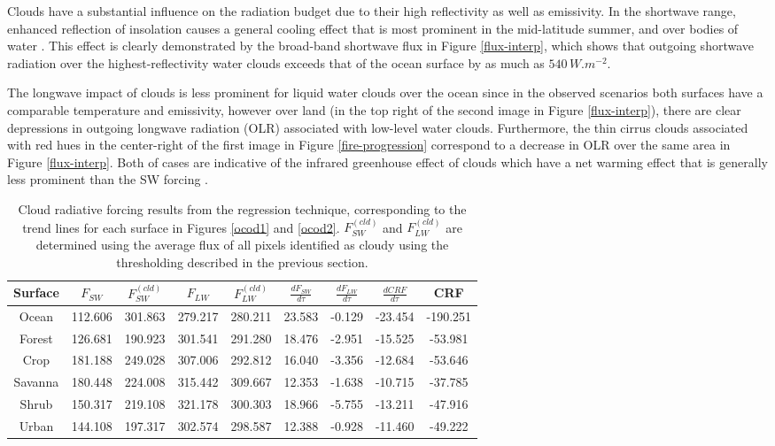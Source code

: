\documentclass[12pt]{article}
\newcommand\T{\rule{0pt}{2.6ex}}       %
\newcommand\B{\rule[-1.2ex]{0pt}{0pt}} %
\begin{document}
     Clouds have a substantial influence on the radiation budget due to their high reflectivity as well as emissivity. In the shortwave range, enhanced reflection of insolation causes a general cooling effect that is most prominent in the mid-latitude summer, and over bodies of water \cite{harrison_seasonal_1990}. This effect is clearly demonstrated by the broad-band shortwave flux in Figure \ref{flux-interp}, which shows that outgoing shortwave radiation over the highest-reflectivity water clouds exceeds that of the ocean surface by as much as $540\,\si{W.m^{-2}}$.

    The longwave impact of clouds is less prominent for liquid water clouds over the ocean since in the observed scenarios both surfaces have a comparable temperature and emissivity, however over land (in the top right of the second image in Figure \ref{flux-interp}), there are clear depressions in outgoing longwave radiation (OLR) associated with low-level water clouds. Furthermore, the thin cirrus clouds associated with red hues in the center-right of the first image in Figure \ref{fire-progression} correspond to a decrease in OLR over the same area in Figure \ref{flux-interp}. Both of cases are indicative of the infrared greenhouse effect of clouds which have a net warming effect that is generally less prominent than the SW forcing \cite{ramanathan_cloud-radiative_1989}.

    \begin{table}[h!]\label{}
        \centering
        \begin{tabular}{c | c c | c c | c c | c c }
            Surface & $F_{SW} $ & $F^{(cld)}_{SW}$ & $F_{LW}$ & $F^{(cld)}_{LW}$ & $\frac{dF_{SW}}{d\tau}$ & $\frac{dF_{LW}}{d\tau}$ & $\frac{dCRF}{d\tau}$ & CRF \B\\
            \hline
            Ocean & 112.606 & 301.863 & 279.217 & 280.211  & 23.583 & -0.129 & -23.454 & -190.251 \T\\
            Forest & 126.681 & 190.923 & 301.541 & 291.280 & 18.476 & -2.951 & -15.525 & -53.981 \\
            Crop & 181.188 & 249.028 & 307.006 & 292.812 & 16.040 & -3.356 & -12.684 & -53.646 \\
            Savanna & 180.448 & 224.008 & 315.442 & 309.667 & 12.353 & -1.638 & -10.715 & -37.785 \\
            Shrub & 150.317 & 219.108 & 321.178 & 300.303 & 18.966 & -5.755 & -13.211 & -47.916 \\
            Urban & 144.108 & 197.317 & 302.574 & 298.587 & 12.388 & -0.928 & -11.460 & -49.222 \\
        \end{tabular}
        \caption{Cloud radiative forcing results from the regression technique, corresponding to the trend lines for each surface in Figures \ref{ocod1} and \ref{ocod2}. $F^{(cld)}_{SW}$ and $F^{(cld)}_{LW}$ are determined using the average flux of all pixels identified as cloudy using the thresholding described in the previous section.}
    \end{table}
\end{document}
